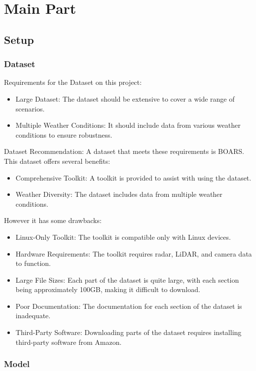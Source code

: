 \chapter{Main Part}
\section{Setup}
\subsection{Dataset}
Requirements for the Dataset on this project:
\begin{itemize}
    \item Large Dataset: The dataset should be extensive to cover a wide range of scenarios.
    \item Multiple Weather Conditions: It should include data from various weather conditions to ensure robustness.
\end{itemize}
Dataset Recommendation: A dataset that meets these requirements is BOARS.\\
This dataset offers several benefits:
\begin{itemize}
    \item Comprehensive Toolkit: A toolkit is provided to assist with using the dataset.
    \item Weather Diversity: The dataset includes data from multiple weather conditions.
\end{itemize}
However it has some drawbacks:
\begin{itemize}
    \item Linux-Only Toolkit: The toolkit is compatible only with Linux devices.
    \item Hardware Requirements: The toolkit requires radar, LiDAR, and camera data to function.
    \item Large File Sizes: Each part of the dataset is quite large, with each section being approximately 100GB, making it difficult to download.
    \item Poor Documentation: The documentation for each section of the dataset is inadequate.
    \item Third-Party Software: Downloading parts of the dataset requires installing third-party software from Amazon.
\end{itemize}

\subsection{Model}

